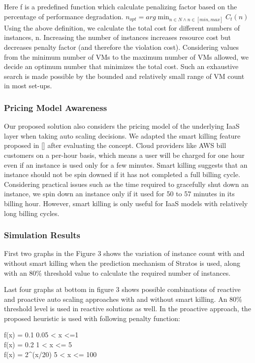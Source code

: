 Here f is a predefined function which calculate penalizing factor based on the percentage of performance degradation. $n_{opt} = arg \min_{n \in N \land n \in [min, max]}C_t(n) $
\\

Using the above definition, we calculate the total cost for different numbers of instances, n. Increasing the number of instances increases resource cost but decreases penalty factor (and therefore the violation cost). Considering values from the minimum number of VMs to the maximum number of VMs allowed, we decide an optimum number that minimizes the total cost. Such an exhaustive search is made possible by the bounded and relatively small range of VM count in most set-ups.
\subsubsection {Pricing Model Awareness}

Our proposed solution also considers the pricing model of the underlying IaaS layer when taking auto scaling decisions. We adapted the smart killing feature proposed in [\cite{pluggable}] after evaluating the concept. Cloud providers like AWS bill customers on a per-hour basis, which means a user will be charged for one hour even if an instance is used only for a few minutes. Smart killing suggests that an instance should not be spin downed if it has not completed a full billing cycle. Considering practical issues such as the time required to gracefully shut down an instance, we spin down an instance only if it used for 50 to 57 minutes in its billing hour. However, smart killing is only useful for IaaS models with relatively long billing cycles.

\subsubsection{Simulation Results}
First two graphs in the Figure 3 shows the variation of instance count with and without smart killing when the prediction mechanism of Stratos is used, along with an 80\% threshold value to calculate the required number of instances.

Last four graphs at bottom in figure 3 shows possible combinations of reactive and proactive auto scaling approaches with and without smart killing. An 80\% threshold level is used in reactive solutions as well. In the proactive approach, the proposed heuristic is used with following penalty function:

f(x) = 0.1    0.05 < x <=1 \\
f(x) = 0.2    1 < x <= 5 \\
f(x) = 2^(x/20)    5 < x <= 100 

